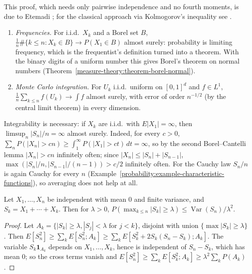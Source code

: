 This proof, which needs only pairwise independence and no fourth moments, is due to Etemadi \cite{etemadi-1981}; for the classical approach via Kolmogorov's inequality see \cite{billingsley-probability}.

\begin{example}\label{probability:example-strong-law}
\begin{enumerate}
\item \emph{Frequencies.} For i.i.d.\ $X_k$ and a Borel set $B$, $\frac1n\#\{k \leq n : X_k \in B\} \to P(X_1 \in B)$ almost surely: probability is limiting frequency, which is the frequentist's definition turned into a theorem. With
the binary digits of a uniform number this gives Borel's theorem on normal numbers (Theorem~\ref{measure-theory:theorem-borel-normal}).
\item \emph{Monte Carlo integration.} For $U_k$ i.i.d.\ uniform on $[0, 1]^d$ and $f \in L^1$, $\frac1n\sum_{k \leq n}f(U_k) \to \int f$ almost surely, with error of order $n^{-1/2}$ (by the central limit theorem) in every dimension.
\end{enumerate}
\end{example}

\begin{counterexample}\label{probability:counterexample-no-mean}
Integrability is necessary: if $X_k$ are i.i.d.\ with $E|X_1| = \infty$, then $\limsup_n|S_n|/n = \infty$ almost surely. Indeed, for every $c > 0$, $\sum_nP(|X_n| > cn) \geq \int_1^\infty P(|X_1| > ct)\,dt = \infty$, so by the second
Borel--Cantelli lemma $|X_n| > cn$ infinitely often; since $|X_n| \leq |S_n| + |S_{n-1}|$, $\max(|S_n|/n, |S_{n-1}|/(n - 1)) > c/2$ infinitely often. For the Cauchy law $S_n/n$ is again Cauchy for every $n$
(Example~\ref{probability:example-characteristic-functions}), so averaging does not help at all.
\end{counterexample}

\begin{theorem}\label{probability:theorem-kolmogorov-inequality}
Let $X_1, \ldots, X_n$ be independent with mean $0$ and finite variance, and $S_k = X_1 + \cdots + X_k$. Then for $\lambda > 0$,
$P(\max_{k \leq n}|S_k| \geq \lambda) \leq \operatorname{Var}(S_n)/\lambda^2$.
\end{theorem}

\begin{proof}
Let $A_k = \{|S_k| \geq \lambda, |S_j| < \lambda \text{ for } j < k\}$, disjoint with union $\{\max|S_k| \geq \lambda\}$. Then $E[S_n^2] \geq \sum_kE[S_n^2; A_k] \geq \sum_kE[S_k^2 + 2S_k(S_n - S_k); A_k]$. The variable $S_k\mathbf{1}_{A_k}$ depends
on $X_1, \ldots, X_k$, hence is independent of $S_n - S_k$, which has mean $0$; so the cross terms vanish and $E[S_n^2] \geq \sum_kE[S_k^2; A_k] \geq \lambda^2\sum_kP(A_k)$.
\end{proof}

